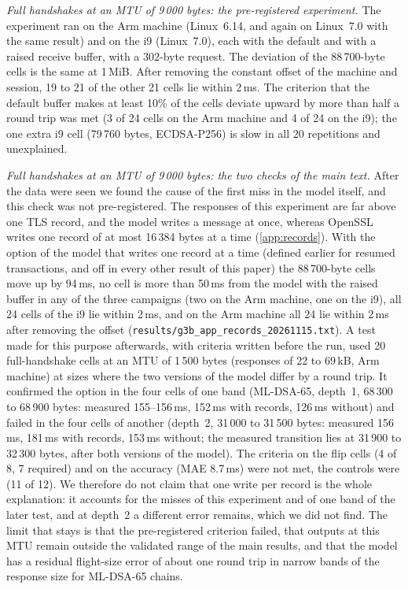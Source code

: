 \documentclass[preprint,12pt]{elsarticle}
\newcommand{\ms}{\,ms\xspace}
\begin{document}
\emph{Full handshakes at an MTU of 9\,000 bytes: the pre-registered experiment.} The experiment ran on the Arm machine (Linux~6.14, and again on Linux~7.0 with the same result) and on the i9 (Linux~7.0), each with the default and with a raised receive buffer, with a 302-byte request. The deviation of the 88\,700-byte cells is the same at 1\,MiB. After removing the constant offset of the machine and session, 19 to 21 of the other 21 cells lie within 2\ms. The criterion that the default buffer makes at least 10\% of the cells deviate upward by more than half a round trip was met (3 of 24 cells on the Arm machine and 4 of 24 on the i9); the one extra i9 cell (79\,760 bytes, ECDSA-P256) is slow in all 20 repetitions and unexplained.

\emph{Full handshakes at an MTU of 9\,000 bytes: the two checks of the main text.} After the data were seen we found the cause of the first miss in the model itself, and this check was not pre-registered. The responses of this experiment are far above one TLS record, and the model writes a message at once, whereas OpenSSL writes one record of at most 16\,384 bytes at a time (\cref{app:records}). With the option of the model that writes one record at a time (defined earlier for resumed transactions, and off in every other result of this paper) the 88\,700-byte cells move up by 94\ms, no cell is more than 50\ms from the model with the raised buffer in any of the three campaigns (two on the Arm machine, one on the i9), all 24 cells of the i9 lie within 2\ms, and on the Arm machine all 24 lie within 2\ms after removing the offset (\texttt{results/g3b\_app\_records\_20261115.txt}). A test made for this purpose afterwards, with criteria written before the run, used 20 full-handshake cells at an MTU of 1\,500 bytes (responses of 22 to 69\,kB, Arm machine) at sizes where the two versions of the model differ by a round trip. It confirmed the option in the four cells of one band (ML-DSA-65, depth~1, 68\,300 to 68\,900 bytes: measured 155--156\ms, 152\ms with records, 126\ms without) and failed in the four cells of another (depth~2, 31\,000 to 31\,500 bytes: measured 156\ms, 181\ms with records, 153\ms without; the measured transition lies at 31\,900 to 32\,300 bytes, after both versions of the model). The criteria on the flip cells (4 of 8, 7 required) and on the accuracy (MAE 8.7\ms) were not met, the controls were (11 of 12). We therefore do not claim that one write per record is the whole explanation: it accounts for the misses of this experiment and of one band of the later test, and at depth~2 a different error remains, which we did not find. The limit that stays is that the pre-registered criterion failed, that outputs at this MTU remain outside the validated range of the main results, and that the model has a residual flight-size error of about one round trip in narrow bands of the response size for ML-DSA-65 chains.
\end{document}
